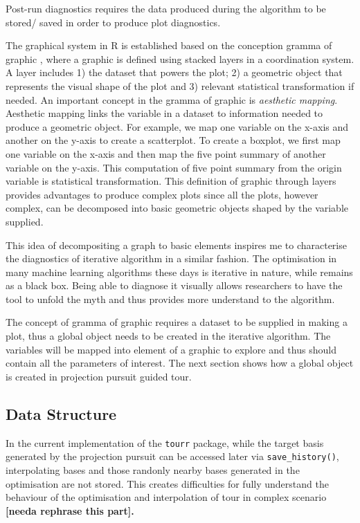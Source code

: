 \documentclass[12pt]{article}
\begin{document}
Post-run diagnostics requires the data produced during the algorithm to
be stored/ saved in order to produce plot diagnostics.

The graphical system in R is established based on the conception gramma
of graphic \citep{wickham2010layered}, where a graphic is defined using
stacked layers in a coordination system. A layer includes 1) the dataset
that powers the plot; 2) a geometric object that represents the visual
shape of the plot and 3) relevant statistical transformation if needed.
An important concept in the gramma of graphic is \emph{aesthetic
mapping}. Aesthetic mapping links the variable in a dataset to
information needed to produce a geometric object. For example, we map
one variable on the x-axis and another on the y-axis to create a
scatterplot. To create a boxplot, we first map one variable on the
x-axis and then map the five point summary of another variable on the
y-axis. This computation of five point summary from the origin variable
is statistical transformation. This definition of graphic through layers
provides advantages to produce complex plots since all the plots,
however complex, can be decomposed into basic geometric objects shaped
by the variable supplied.

This idea of decompositing a graph to basic elements inspires me to
characterise the diagnostics of iterative algorithm in a similar
fashion. The optimisation in many machine learning algorithms these days
is iterative in nature, while remains as a black box. Being able to
diagnose it visually allows researchers to have the tool to unfold the
myth and thus provides more understand to the algorithm.

The concept of gramma of graphic requires a dataset to be supplied in
making a plot, thus a global object needs to be created in the iterative
algorithm. The variables will be mapped into element of a graphic to
explore and thus should contain all the parameters of interest. The next
section shows how a global object is created in projection pursuit
guided tour.

\hypertarget{data-structure}{%
\subsection{Data Structure}\label{data-structure}}

In the current implementation of the \texttt{tourr} package, while the
target basis generated by the projection pursuit can be accessed later
via \texttt{save\_history()}, interpolating bases and those randonly
nearby bases generated in the optimisation are not stored. This creates
difficulties for fully understand the behaviour of the optimisation and
interpolation of tour in complex scenario \textbf{{[}needa rephrase this
part{]}.}
\end{document}
